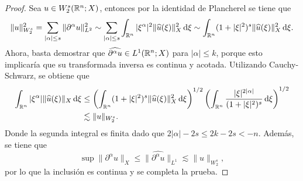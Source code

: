 \begin{proof}
	Sea $u\in W^s_2(\mathbb{R}^n;X)$, entonces por la identidad de Plancherel se tiene que 
	\begin{equation*}
		\|u\|_{W^s_2}^2 = \sum_{|\alpha|\leq s} \|\partial^\alpha u\|_{L^2}^2  \sim  \sum_{|\alpha|\leq s} \int_{\mathbb{R}^n} |\xi^\alpha|^2\|\widehat{u}(\xi)\|_X^2 \mathop{}\!\mathrm{d} \xi \sim  \int_{\mathbb{R}^n} (1+|\xi|^2)^s \|\widehat{u}(\xi)\|_X^2 \mathop{}\!\mathrm{d} \xi.
	\end{equation*}
	Ahora, basta demostrar que $\widehat{\partial^\alpha u} \in L^1(\mathbb{R}^n;X)$ para $|\alpha|\leq k$, porque esto implicaría que su transformada inversa es continua y acotada. Utilizando Cauchy-Schwarz, se obtiene que 
	\begin{align*}
		 \int_{\mathbb{R}^n} |\xi^\alpha|\|\widehat{u}(\xi)\|_X \mathop{}\!\mathrm{d} \xi & \leq 
		 \left( \int_{\mathbb{R}^n} (1+|\xi|^2)^s \|\widehat{u}(\xi)\|_X^2 \mathop{}\!\mathrm{d} \xi \right)^{1/2}
		 \left( \int_{\mathbb{R}^n} \frac{|\xi|^{2|\alpha|}}{(1+|\xi|^2)^s}  \mathop{}\!\mathrm{d} \xi \right)^{1/2} \\
		 & \lesssim \|u\|_{W^s_2}.
	\end{align*}
	Donde la segunda integral es finita dado que $2|\alpha| - 2s \leq 2k -2s < -n$. Además, se tiene que 
	\begin{equation*}
		\sup\|\partial^\alpha u\|_X \leq \|\widehat{\partial^\alpha u} \|_{L^1} \lesssim  \|u\|_{W^s_2},
	\end{equation*}
	por lo que la inclusión es continua y se completa la prueba.
\end{proof}
